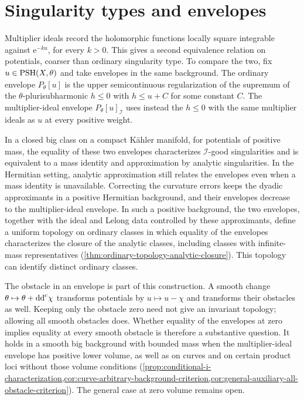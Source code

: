 \section*{Singularity types and envelopes}

Multiplier ideals record the holomorphic functions locally square integrable against $\mathrm e^{-ku}$, for every $k>0$. This gives a second equivalence relation on potentials, coarser than ordinary singularity type. To compare the two, fix $u\in\mathrm{PSH}(X,\theta)$ and take envelopes in the same background. The ordinary envelope $P_\theta[u]$ is the upper semicontinuous regularization of the supremum of the $\theta$-plurisubharmonic $h\leq0$ with $h\leq u+C$ for some constant $C$. The multiplier-ideal envelope $P_\theta[u]_{\mathcal I}$ uses instead the $h\leq0$ with the same multiplier ideals as $u$ at every positive weight.

In a closed big class on a compact K\"ahler manifold, for potentials of positive mass, the equality of these two envelopes characterizes $\mathcal I$-good singularities and is equivalent to a mass identity and approximation by analytic singularities. In the Hermitian setting, analytic approximation still relates the envelopes even when a mass identity is unavailable. Correcting the curvature errors keeps the dyadic approximants in a positive Hermitian background, and their envelopes decrease to the multiplier-ideal envelope. In such a positive background, the two envelopes, together with the ideal and Lelong data controlled by these approximants, define a uniform topology on ordinary classes in which equality of the envelopes characterizes the closure of the analytic classes, including classes with infinite-mass representatives (\cref{thm:ordinary-topology-analytic-closure}). This topology can identify distinct ordinary classes.

The obstacle in an envelope is part of this construction. A smooth change $\theta\mapsto\theta+\mathrm{dd}^{\mathrm{c}}\chi$ transforms potentials by $u\mapsto u-\chi$ and transforms their obstacles as well. Keeping only the obstacle zero need not give an invariant topology; allowing all smooth obstacles does. Whether equality of the envelopes at zero implies equality at every smooth obstacle is therefore a substantive question. It holds in a smooth big background with bounded mass when the multiplier-ideal envelope has positive lower volume, as well as on curves and on certain product loci without those volume conditions (\cref{prop:conditional-i-characterization,cor:curve-arbitrary-background-criterion,cor:general-auxiliary-all-obstacle-criterion}). The general case at zero volume remains open.

